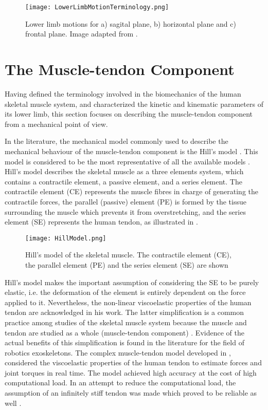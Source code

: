 \begin{figure}[htbp!]
	\centering
	\texttt{[image: LowerLimbMotionTerminology.png]}
	\caption{Lower limb motions for a) sagital plane, b) horizontal plane and c) frontal plane. Image adapted from  \cite{PhysicalSolutions2016}. }
	\label{fig:lower_motion}
\end{figure}

\newpage



\section{The Muscle-tendon Component} \label{sec:muscle_tendon}

Having defined the terminology involved in the biomechanics of the human skeletal muscle system, and characterized the kinetic and kinematic parameters of its lower limb, this section focuses on describing the muscle-tendon component from a mechanical point of view. 

In the literature, the mechanical model commonly used to describe the mechanical behaviour of the muscle-tendon component is the Hill's model \cite{hill1938heat}. This model is considered to be the most representative of all the available models \cite{zhang2012sma}. Hill's model describes the skeletal muscle as a three elements system, which contains a contractile element, a passive element, and a series element. The contractile element (CE) represents the muscle fibres in charge of generating the contractile forces, the parallel (passive) element (PE) is formed by the tissue surrounding the muscle which prevents it from overstretching, and the series element (SE) represents the human tendon, as illustrated in .

\begin{figure}[htb!]
	\centering
	\texttt{[image: HillModel.png]}
	\caption{Hill's model of the skeletal muscle. The contractile element (CE), the parallel element (PE) and the series element (SE) are shown \cite{hill1938heat} }
	\label{fig:hillModel}
\end{figure}

Hill's model makes the important assumption of considering the SE to be purely elastic, i.e. the deformation of the element is entirely dependent on the force applied to it. Nevertheless, the non-linear viscoelastic properties of the human tendon are acknowledged in his work. The latter simplification is a common practice among studies of the skeletal muscle system because the muscle and tendon are studied as a whole (muscle-tendon component) \cite{zajac1989muscle}. Evidence of the actual benefits of this simplification is found in the literature for the field of robotics exoskeletons. The complex muscle-tendon model developed in \cite{lloyd2003emg}, considered the viscoelastic properties of the human tendon to estimate forces and joint torques in real time. The model achieved high accuracy at the cost of high computational load. In an attempt to reduce the computational load, the assumption of an infinitely stiff tendon was made which proved to be reliable as well \cite{sartori2009stiff}.

